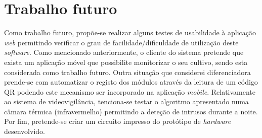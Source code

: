 


\section{Trabalho futuro}



Como trabalho futuro, propõe-se realizar alguns testes de usabilidade à aplicação \textit{web} permitindo verificar o grau de facilidade/dificuldade de utilização deste \textit{software}.  Como mencionado anteriormente, o cliente do sistema pretende que exista um aplicação móvel que possibilite monitorizar o seu cultivo, sendo esta considerada como trabalho futuro. Outra situação que considerei diferenciadora prende-se com automatizar o registo dos módulos através da leitura de um código \ac{QR} podendo este mecanismo ser incorporado na aplicação \textit{mobile}. Relativamente ao sistema de videovigilância, tenciona-se testar o algoritmo apresentado numa câmara térmica (infravermelho) permitindo a deteção de intrusos durante a noite. Por fim, pretende-se criar um circuito impresso do protótipo de \textit{hardware} desenvolvido. 











 
